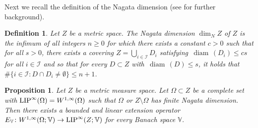 \documentclass[reqno]{amsart}
\newcommand{\LIP}{{\rm LIP}}
\numberwithin{equation}{section}
\newtheorem{proposition}[theorem]{Proposition}
\newtheorem{definition}[theorem]{Definition}
\theoremstyle{remark}
\DeclareMathOperator{\diam}{diam}
\def\diam{{\mathop\mathrm{\,diam\,}}}
\begin{document}
Next we recall the definition of the Nagata dimension (see \cite{La:Sch:05} for further background).
\begin{definition}\label{def:Nag_dim}
    Let $Z$ be a metric space. The Nagata dimension $\dim_N Z$ of $Z$ is the infimum of all integers $n\geq 0$ for which there
exists a constant $c>0$ such that for all $s>0$, there exists a covering $Z=\bigcup_{i\in \mathcal I}D_i$ satisfying $\diam(D_i)\leq cs$ for all $i\in\mathcal I$ and so that for every $D\subset Z$ with $\diam(D)\leq s$, it holds that $\#\{ i\in\mathcal I\colon  D\cap D_i\neq \emptyset \}\leq n+1$.
\end{definition}
\begin{proposition}\label{prop:real-to-Banach}
Let $Z$ be a metric measure space. Let $\Omega \subset Z$ be a complete set with $\LIP^{\infty}(\Omega) = W^{1,\infty}(\Omega)$ such that $\Omega$ or $Z \setminus \Omega$ has finite Nagata dimension. Then there exists a bounded and linear extension operator $E_{ \mathbb{V} } \colon W^{1,\infty}( \Omega; \mathbb{V} ) \rightarrow \LIP^{\infty}(Z; \mathbb{V} )$ for every Banach space $\mathbb{V}$. 
\end{proposition}
\end{document}

